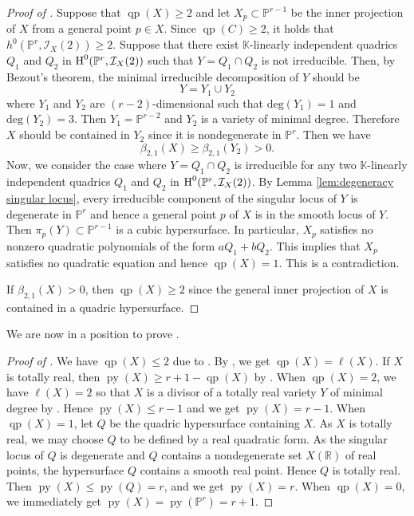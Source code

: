 \documentclass[11pt,letterpaper,reqno]{amsart}
\theoremstyle{plain}
\theoremstyle{definition}
\newtheorem{open problem}[theorem]{Open Problem}
\newtheorem{remark and notation}[theorem]{Remark and Notation}
\newtheorem{remark and definition}[theorem]{Remark and Definition}
\newtheorem{definition and notation}[theorem]{Definition and Notation}
\newtheorem{notation and convention}[theorem]{Notation and Convention}
\newtheorem{notation and remark}[theorem]{Notation and Remark}
\newtheorem{convention and notation}[theorem]{Convention and Notation}
\def \p {\mathbb{P}}
\def \r {\mathbb{R}}
\def \i {\mathcal{I}}
\def \H {\textnormal{H}}
\def \py {\operatorname{py}}
\def \qp {\operatorname{qp}}
\begin{document}
\begin{proof}[Proof of ]
Suppose that $\qp (X) \geq 2$ and let $X_p \subset \p^{r-1}$ be the inner projection of $X$ from a general point $p \in X$. Since $\qp(C) \geq 2$, it holds that $h^0 (\p^r,\i_X (2)) \geq 2$. Suppose that there exist $\mathbb{K}$-linearly independent quadrics $Q_1$ and $Q_2$ in $\H^0 (\p^r,\i_X (2))$ such that $Y = Q_1 \cap Q_2$ is not irreducible. Then, by Bezout's theorem, the minimal irreducible decomposition of $Y$ should be
$$Y = Y_1 \cup Y_2$$
where $Y_1$ and $Y_2$ are $(r-2)$-dimensional such that $\mbox{deg} (Y_1 ) =1$ and $\mbox{deg} (Y_2 ) =3$. Then $Y_1 = \p^{r-2}$ and $Y_2$ is a variety of minimal degree. Therefore $X$ should be contained in $Y_2$ since it is nondegenerate in $\p^r$. Then we have
$$\beta_{2,1} (X) \geq \beta_{2,1} (Y_2) >0. $$
Now, we consider the case where $Y = Q_1 \cap Q_2$ is irreducible for any two $\mathbb{K}$-linearly independent quadrics $Q_1$ and $Q_2$ in $\H^0 (\p^r,\i_X (2))$. By Lemma \ref{lem:degeneracy singular locus}, every irreducible component of the singular locus of $Y$ is degenerate in $\p^r$ and hence a general point $p$ of $X$ is in the smooth locus of $Y$. Then $\pi_p (Y) \subset \p^{r-1}$ is a cubic hypersurface. In particular, $X_p$ satisfies no nonzero quadratic polynomials of the form $aQ_1 +bQ_2$. This implies that $X_p$ satisfies no quadratic equation and hence $\qp (X) = 1$. This is a contradiction.

If $\beta_{2,1} (X) > 0$, then $\qp(X) \geq 2$ since the general inner projection of $X$ is contained in a quadric hypersurface.
\end{proof}

We are now in a position to prove .

\begin{proof}[Proof of ]
We have $\qp(X)\leq 2$ due to .
By , we get $\qp(X)=\ell(X)$.
If $X$ is totally real, then $\py(X)\geq r+1-\qp(X)$ by .
When $\qp(X)=2$, we have $\ell(X)=2$ so that $X$ is a divisor of a totally real variety $Y$ of minimal degree by .
Hence $\py(X)\leq r-1$ and we get $\py(X)=r-1$.
When $\qp(X)=1$, let $Q$ be the quadric hypersurface containing $X$.
As $X$ is totally real, we may choose $Q$ to be defined by a real quadratic form. 
As the singular locus of $Q$ is degenerate and $Q$ contains a nondegenerate set $X(\r)$ of real points, the hypersurface $Q$ contains a smooth real point. 
Hence $Q$ is totally real.
Then $\py(X)\leq \py(Q)=r$, and we get $\py(X)=r$.
When $\qp(X)=0$, we immediately get $\py(X)=\py(\p^r)=r+1$.
\end{proof}
\end{document}
